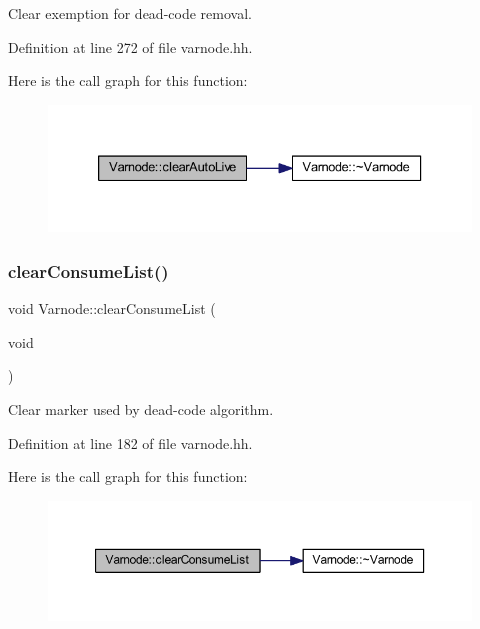Clear exemption for dead-\/code removal. 



Definition at line 272 of file varnode.\+hh.

Here is the call graph for this function\+:
\nopagebreak
\begin{figure}[H]
\begin{center}
\leavevmode
\includegraphics[width=333pt]{class_varnode_a39d6bd8e32a09ade4ce560a4356c379b_cgraph}
\end{center}
\end{figure}
\mbox{\label{class_varnode_a0af9c863ba496cd2f4edd87cfca16681}} 
\subsubsection{\texorpdfstring{clearConsumeList()}{clearConsumeList()}}
{\footnotesize\ttfamily void Varnode\+::clear\+Consume\+List (\begin{DoxyParamCaption}\item[{void}]{ }\end{DoxyParamCaption})\hspace{0.3cm}{\ttfamily [inline]}}



Clear marker used by dead-\/code algorithm. 



Definition at line 182 of file varnode.\+hh.

Here is the call graph for this function\+:
\nopagebreak
\begin{figure}[H]
\begin{center}
\leavevmode
\includegraphics[width=350pt]{class_varnode_a0af9c863ba496cd2f4edd87cfca16681_cgraph}
\end{center}
\end{figure}
\mbox{\label{class_varnode_a71bc569e459e904cd199c89340a212e0}} 
